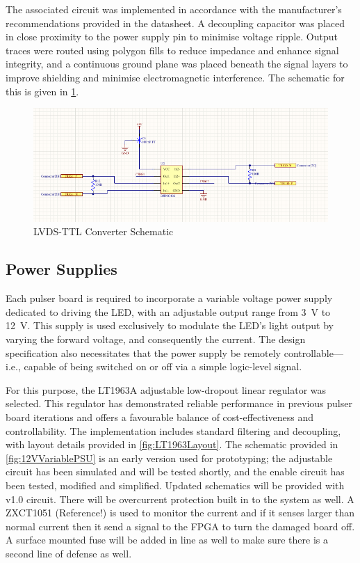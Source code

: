 \documentclass[a4paper,11pt]{article}
\begin{document}
The associated circuit was implemented in accordance with the manufacturer's recommendations provided in the datasheet. A decoupling capacitor was placed in close proximity to the power supply pin to minimise voltage ripple. Output traces were routed using polygon fills to reduce impedance and enhance signal integrity, and a continuous ground plane was placed beneath the signal layers to improve shielding and minimise electromagnetic interference. The schematic for this is given in \cref{fig:lvdsttl}.

\begin{figure}[htbp]
\centering
\includegraphics[scale=0.8]{LVDS-TTL Converter.png}
\caption{LVDS-TTL Converter Schematic\label{fig:lvdsttl}}
\end{figure}


\subsection{Power Supplies}\label{sec:LEDpower}

Each pulser board is required to incorporate a variable voltage power supply dedicated to driving the LED, with an adjustable output range from 3~V to 12~V. This supply is used exclusively to modulate the LED’s light output by varying the forward voltage, and consequently the current. The design specification also necessitates that the power supply be remotely controllable—i.e., capable of being switched on or off via a simple logic-level signal.

For this purpose, the LT1963A \cite{LT1963} adjustable low-dropout linear regulator was selected. This regulator has demonstrated reliable performance in previous pulser board iterations and offers a favourable balance of cost-effectiveness and controllability. The implementation includes standard filtering and decoupling, with layout details provided in \cref{fig:LT1963Layout}. The schematic provided in \cref{fig:12VVariablePSU} is an early version used for prototyping; the adjustable circuit has been simulated and will be tested shortly, and the enable circuit has been tested, modified and simplified. Updated schematics will be provided with v1.0 circuit. There will be overcurrent protection built in to the system as well. A ZXCT1051 (Reference!) is used to monitor the current and if it senses larger than normal current then it send a signal to the FPGA to turn the damaged board off. A surface mounted fuse will be added in line as well to make sure there is a second line of defense as well.
\end{document}
